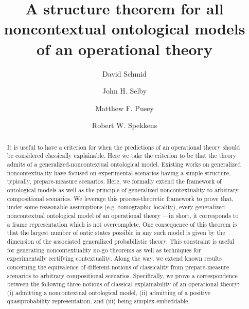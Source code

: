 \documentclass[onecolum,aps,groupedaddress,nofootinbib]{revtex4-2}
\begin{document}
\title{A structure theorem for all noncontextual ontological models of an operational theory}
\author{David Schmid}
\author{John H. Selby}
\author{Matthew F. Pusey}
\author{Robert W. Spekkens}
\begin{abstract}
It is useful to have a criterion for when the predictions of an operational theory should be considered classically explainable.  Here we take the criterion to be that the theory
admits of
 a generalized-noncontextual ontological model. Existing works on generalized noncontextuality have focused on experimental scenarios having a simple structure, typically, prepare-measure scenarios.
 Here, we formally extend the framework of ontological models as well as the principle of generalized noncontextuality to arbitrary compositional scenarios.
We leverage this process-theoretic framework to prove that, under some reasonable assumptions (e.g. tomographic locality),  every generalized-noncontextual ontological model of an operational theory 
---in short, it corresponds to a frame representation which is not overcomplete. 
One consequence of this theorem is that the largest number of ontic states possible in any such model is given by the dimension of the associated generalized probabilistic theory. This constraint is useful for generating noncontextuality no-go theorems as well as techniques for experimentally certifying contextuality.
Along the way, we extend known results concerning the equivalence of different notions of classicality from prepare-measure scenarios to arbitrary compositional scenarios.
Specifically, we prove a correspondence between
 the following three notions of classical explainability of an operational theory: (i) admitting a noncontextual ontological model, (ii) admitting of a positive quasiprobability representation, and (iii) being simplex-embeddable.
\end{abstract}
\end{document}
